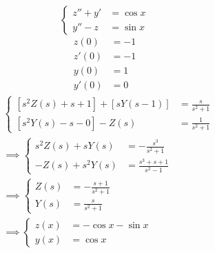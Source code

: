 \documentclass[11pt,a4paper,titlepage,final]{article}
\begin{document}
\begin{exercise*}{12.16}
	\[
	\begin{cases}
	z''+y'&=\cos x \\
	y''-z&=\sin x
	\end{cases}
	\]
	\begin{align*}
	z(0) &= -1\\
	z'(0) &= -1 \\
	y(0) &= 1 \\
	y'(0) &= 0
	\end{align*}
	\tcblower
	\begin{align*}
	& \begin{cases}
	\left[s^2Z(s)+s+1\right]+\left[sY(s-1)\right] &= \frac{s}{s^2+1} \\
	\left[s^2Y(s)-s-0\right]-Z(s) &= \frac{1}{s^2+1}
	\end{cases} \\ &\implies 
	\begin{cases}
	s^2Z(s)+sY(s) &= -\frac{s^3}{s^2+1} \\
	-Z(s)+s^2Y(s) &= \frac{s^3+s+1}{s^2-1}
	\end{cases} \\
	& \implies \begin{cases}
	Z(s) &= -\frac{s+1}{s^2+1} \\
	Y(s) &= \frac{s}{s^2+1}
	\end{cases} \\
	& \implies \begin{cases}
	z(x) &= -\cos x-\sin x \\
	y(x) &= \cos x
	\end{cases}
	\end{align*}
\end{exercise*}
\end{document}
